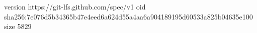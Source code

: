version https://git-lfs.github.com/spec/v1
oid sha256:7e076d5b34365b47e4eed6a624d55a4aa6a904189195d60533a825b04635e100
size 5829
